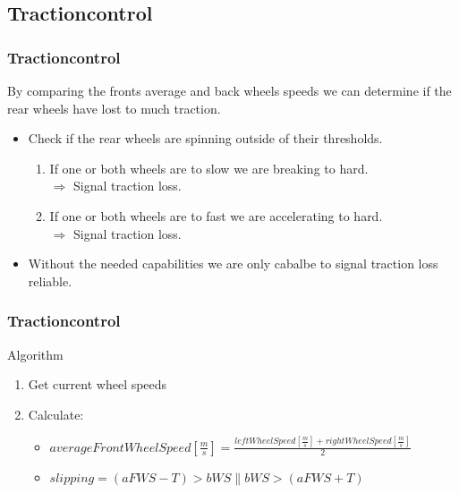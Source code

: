 \documentclass{beamer}
\begin{document}
\subsection{Tractioncontrol}
\begin{frame}
    \frametitle{Tractioncontrol}
    By comparing the fronts average and back wheels speeds we can determine if the rear wheels have lost to much traction.
    \begin{itemize}
    \item Check if the rear wheels are spinning outside of their thresholds.\\
        \begin{enumerate}
        \item If one or both wheels are to slow we are breaking to hard.\\
        $\Rightarrow$ Signal traction loss.\\
        \item If one or both wheels are to fast we are accelerating to hard.\\
        $\Rightarrow$ Signal traction loss.
        \end{enumerate}
     \item Without the needed capabilities we are only cabalbe to signal traction loss reliable.
    \end{itemize}
\end{frame}
\begin{frame}
    \frametitle{Tractioncontrol}
    Algorithm
    \begin{enumerate}
        \item Get current wheel speeds
        \item Calculate: 
        \begin{itemize}
            \item $averageFrontWheelSpeed\left[ \frac{m}{s} \right] = \frac{leftWheelSpeed\left[ \frac{m}{s} \right] + rightWheelSpeed\left[ \frac{m}{s} \right]}{2}$
            \item $slipping = (aFWS-T) > bWS \parallel bWS > (aFWS+T)$
        \end{itemize}
    \end{enumerate}
\end{frame}
\end{document}
